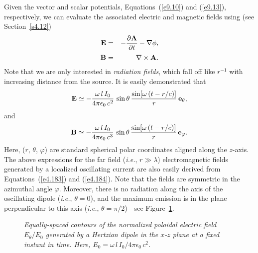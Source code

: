 Given the vector and scalar potentials, Equations~(\ref{e9.10}) and (\ref{e9.13}),
 respectively, we can 
evaluate the associated electric and magnetic fields using (see Section~\ref{s4.12})
\begin{eqnarray}
{\bf E} &=& - \frac{\partial {\bf A}}{\partial t} - \nabla \phi,\\[0.5ex]
{\bf B} &=& \nabla\times {\bf A}.
\end{eqnarray}
Note that we are only interested in {\em radiation fields}, which fall off like $r^{-1}$
with increasing distance from the source. It is easily demonstrated that
\begin{equation}
{\bf E} \simeq - \frac{\omega\, l\, I_0}{4\pi\epsilon_0 \,c^2}\, \sin\theta \,
\frac{\sin[\omega\, (t-r/c)]}{r} \,{\bf e}_\theta,
\end{equation}
and 
\begin{equation}
{\bf B} \simeq -\frac{\omega \,l \,I_0 }{4\pi \epsilon_0 \,c^3} \,\sin \theta \,\frac{\sin
[\omega \,(t-r/c)]}{r}\, {\bf e}_\varphi.
\end{equation}
Here, ($r$, $\theta$, $\varphi$) are standard spherical polar coordinates aligned along
the $z$-axis. The above expressions for the far field ({\em i.e.}, $r\gg \lambda$)
electromagnetic fields generated by a localized oscillating current are also
easily derived from Equations~(\ref{e4.183}) and (\ref{e4.184}). Note that the fields are symmetric in
the azimuthal angle $\varphi$. Moreover, there is no radiation along the axis of the oscillating
dipole ({\em i.e.}, $\theta =0$), and the maximum emission is in the plane perpendicular
to this axis ({\em i.e.}, $\theta = \pi/2$)---see Figure~\ref{f91}. 

\begin{figure}
\centerline{}
\caption{\em Equally-spaced contours of the normalized poloidal electric field $E_\theta/E_0$ generated by
a Hertzian dipole in the $x$-$z$ plane at a fixed instant in time. Here, $E_0=\omega\,l\,I_0/4\pi\epsilon_0\,c^2$. }\label{f91}
\end{figure}


